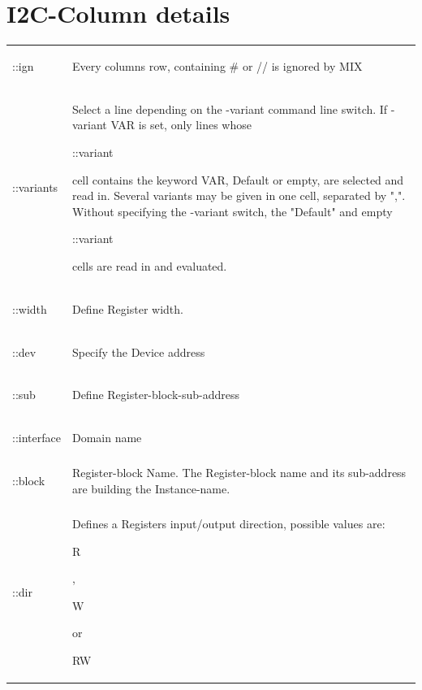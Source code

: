 \documentclass[a4paper,12pt]{report}
\begin{document}
\section{I2C-Column details}
\begin{tabular}{lp{14cm}}
  \begin{bf}::ign\end{bf} & Every columns row, containing \# or // is ignored by MIX\\
  \begin{bf}::variants\end{bf} & Select a line depending on the -variant command line switch. If -variant VAR is set, only lines whose \begin{tt}::variant\end{tt} cell contains the keyword VAR, Default or empty, are selected and  read in. Several variants may be given in one cell, separated by ",". Without specifying the -variant switch, the "Default" and empty \begin{tt}::variant\end{tt} cells are read in and evaluated.\\
  \begin{bf}::width\end{bf} & Define Register width.\\
  \begin{bf}::dev\end{bf} & Specify the Device address\\
  \begin{bf}::sub\end{bf} & Define Register-block-sub-address\\
  \begin{bf}::interface\end{bf} & Domain name\\
  \begin{bf}::block\end{bf} & Register-block Name. The Register-block name and its sub-address are building the Instance-name.\\
  \begin{bf}::dir\end{bf} & Defines a Registers input/output direction, possible values are: \begin{tt}R\end{tt}, \begin{tt}W\end{tt} or \begin{tt}RW\end{tt}\\

\end{tabular}
\end{document}
